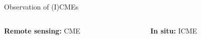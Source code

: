 \documentclass[10pt,aspectratio=169,usenames,dvipsnames]{beamer}
\begin{document}
\begin{frame}{Observation of (I)CMEs}
    \vskip3mm
    \begin{columns}[t]
        \begin{column}{0.45\textwidth}
            \textbf{Remote sensing:} CME
            
            \vskip-5mm\hskip-4mm
        \end{column}
        \begin{column}{0.45\textwidth}
            \textbf{In situ:} ICME

            
        \end{column}
    \end{columns}
\end{frame}
\end{document}
